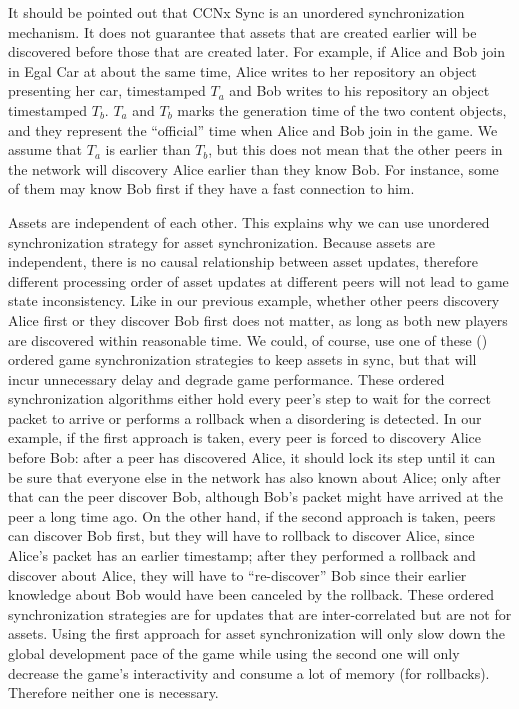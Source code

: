 \documentclass{article}
\begin{document}
It should be pointed out that CCNx Sync is an unordered synchronization mechanism. It does not guarantee that assets that are created earlier will be discovered before those that are created later. For example, if Alice and Bob join in Egal Car at about the same time, Alice writes to her repository an object presenting her car, timestamped $T_a$ and Bob writes to his repository an object timestamped $T_b$. $T_a$ and $T_b$ marks the generation time of the two content objects, and they represent the ``official'' time when Alice and Bob join in the game. We assume that $T_a$ is earlier than $T_b$, but this does not mean that the other peers in the network will discovery Alice earlier than they know Bob. For instance, some of them may know Bob first if they have a fast connection to him.

Assets are independent of each other. This explains why we can use unordered synchronization strategy for asset synchronization. Because assets are independent, there is no causal relationship between asset updates, therefore different processing order of asset updates at different peers will not lead to game state inconsistency. Like in our previous example, whether other peers discovery Alice first or they discover Bob first does not matter, as long as both new players are discovered within reasonable time. We could, of course, use one of these (\cite{Chandy, Bryant, Flockstep, Csync, Doptbkt}) ordered game synchronization strategies to keep assets in sync, but that will incur unnecessary delay and degrade game performance. These ordered synchronization algorithms either hold every peer's step to wait for the correct packet to arrive or performs a rollback when a disordering is detected. In our example, if the first approach is taken, every peer is forced to discovery Alice before Bob: after a peer has discovered Alice, it should lock its step until it can be sure that everyone else in the network has also known about Alice; only after that can the peer discover Bob, although Bob's packet might have arrived at the peer a long time ago. On the other hand, if the second approach is taken, peers can discover Bob first, but they will have to rollback to discover Alice, since Alice's packet has an earlier timestamp; after they performed a rollback and discover about Alice, they will have to ``re-discover'' Bob since their earlier knowledge about Bob would have been canceled by the rollback. These ordered synchronization strategies are for updates that are inter-correlated but are not for assets. Using the first approach for asset synchronization will only slow down the global development pace of the game while using the second one will only decrease the game's interactivity and consume a lot of memory (for rollbacks). Therefore neither one is necessary.
\end{document}
